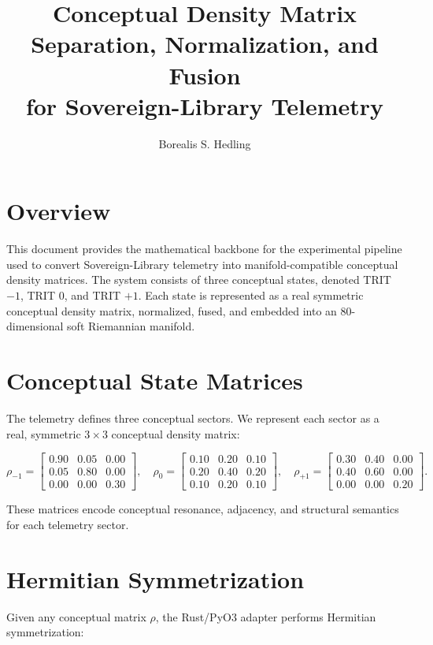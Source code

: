 \documentclass[11pt]{article}
\title{Conceptual Density Matrix Separation, Normalization, and Fusion\\
for Sovereign-Library Telemetry}
\author{Borealis S. Hedling}
\date{}
\begin{document}
\maketitle

\section{Overview}

This document provides the mathematical backbone for the experimental pipeline used to
convert Sovereign-Library telemetry into manifold-compatible conceptual density matrices.
The system consists of three conceptual states, denoted TRIT $-1$, TRIT $0$, and TRIT $+1$.
Each state is represented as a real symmetric conceptual density matrix, normalized,
fused, and embedded into an 80-dimensional soft Riemannian manifold.

\section{Conceptual State Matrices}

The telemetry defines three conceptual sectors. We represent each sector as a real,
symmetric $3 \times 3$ conceptual density matrix:

\[
\rho_{-1} =
\begin{bmatrix}
0.90 & 0.05 & 0.00 \\
0.05 & 0.80 & 0.00 \\
0.00 & 0.00 & 0.30
\end{bmatrix},
\quad
\rho_{0} =
\begin{bmatrix}
0.10 & 0.20 & 0.10 \\
0.20 & 0.40 & 0.20 \\
0.10 & 0.20 & 0.10
\end{bmatrix},
\quad
\rho_{+1} =
\begin{bmatrix}
0.30 & 0.40 & 0.00 \\
0.40 & 0.60 & 0.00 \\
0.00 & 0.00 & 0.20
\end{bmatrix}.
\]

These matrices encode conceptual resonance, adjacency, and structural semantics for each
telemetry sector.

\section{Hermitian Symmetrization}

Given any conceptual matrix $\rho$, the Rust/PyO3 adapter performs Hermitian
symmetrization:
\end{document}
